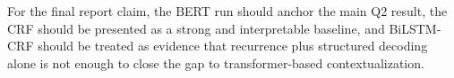 For the final report claim, the BERT run should anchor the main Q2 result, the CRF should be presented as a strong and interpretable baseline, and BiLSTM-CRF should be treated as evidence that recurrence plus structured decoding alone is not enough to close the gap to transformer-based contextualization.